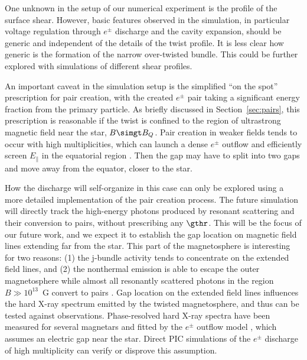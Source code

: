 One unknown in the setup of our numerical experiment is the profile of the
surface shear. However, basic features observed in the simulation, in particular
voltage regulation through $e^\pm$ discharge and the cavity expansion, should be
generic and independent of the details of the twist profile. It is less clear
how generic is the formation of the narrow over-twisted bundle. This could be
further explored with simulations of different shear profiles.

An important caveat in the simulation setup is the simplified ``on the spot''
prescription for pair creation, with the created $e^\pm$ pair taking a
significant energy fraction from the primary particle. As briefly discussed in
Section~\ref{sec:pairs}, this prescription is reasonable if the twist is
confined to the region of ultrastrong magnetic field near the star, $B\simgt
B_Q$. Pair creation in weaker fields tends to occur with high multiplicities,
which can launch a dense $e^\pm$ outflow and efficiently screen $E_\parallel$ in
the equatorial region \citep{2013ApJ...762...13B}. Then the gap may have to
split into two gaps and move away from the equator, closer to the star.

How the discharge will self-organize in this case can only be explored using a
more detailed implementation of the pair creation process. The future simulation
will directly track the high-energy photons produced by resonant
scattering and their conversion to pairs, without prescribing any $\gthr$.
This will be the focus of our future work, and we expect it to establish the gap location
on magnetic field lines extending far from the star. This part of the magnetosphere is
interesting for two reasons: (1) the j-bundle activity tends to
concentrate on the extended field lines, and (2) the nonthermal emission
is able to escape the outer magnetosphere while almost all resonantly scattered
photons in the region $B\gg10^{13}$~G convert to pairs \citep{2013ApJ...762...13B}.
Gap location on the extended field lines influences the hard X-ray spectrum
emitted by the twisted magnetosphere, and thus can be tested against observations.
Phase-resolved hard X-ray spectra have been measured for several magnetars
and fitted by the $e^\pm$ outflow model
\citetext{e.g. \citealp{2014ApJ...786L...1H}; \citealp{2015ApJ...807...93A}},
which assumes an electric gap near the star. Direct PIC simulations of the $e^\pm$
discharge
of high
multiplicity can verify or disprove this assumption.


